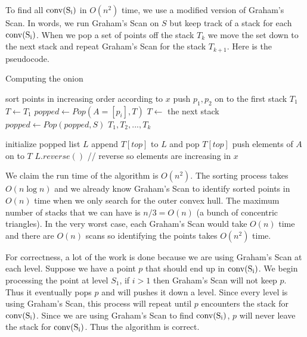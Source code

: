 \documentclass[11pt]{article}
\newcommand{\conv}[1]{\rm{conv}(#1)}
\begin{document}
\answer
To find all $\conv{S_i}$ in $O(n^2)$ time, we use a modified version of Graham's Scan.
In words, we run Graham's Scan on $S$ but keep track of a stack for each $\conv{S_i}$.
When we pop a set of points off the stack $T_k$ we move the set down to the next stack and repeat Graham's Scan for the stack $T_{k+1}$.
Here is the pseudocode.

\begin{algorithm}
\caption{Computing the onion}
    \label{alg:onion}
    \begin{algorithmic}[1]
        \State sort points in increasing order according to $x$
        \State push $p_1, p_2$ on to the first stack $T_1$
            \State $T \gets T_1$
            \State $popped \gets Pop(A=[p_i], T)$
                \State $T \gets$ the next stack
                \State $popped \gets Pop(popped, S)$
            \EndWhile
        \EndFor
        \State \Return $T_1, T_2, ..., T_k$
    \EndFunction
    \end{algorithmic}

    \begin{algorithmic}[1]
        \State initialize popped list $L$
            \State append $T[top]$ to $L$ and pop $T[top]$
        \EndWhile
        \State push elements of $A$ on to $T$
        \State \Return $L.reverse()$ // reverse so elements are increasing in $x$
    \EndFunction
    \end{algorithmic}
\end{algorithm}

We claim the run time of the algorithm is $O(n^2)$.
The sorting process takes $O(n \log n)$ and we already know Graham's Scan to identify sorted points in $O(n)$ time when we only search for the outer convex hull.
The maximum number of stacks that we can have is $n/3 = O(n)$ (a bunch of concentric triangles).
In the very worst case, each Graham's Scan would take $O(n)$ time and there are $O(n)$ scans so identifying the points takes $O(n^2)$ time.

For correctness, a lot of the work is done because we are using Graham's Scan at each level.
Suppose we have a point $p$ that should end up in $\conv{S_i}$.
We begin processing the point at level $S_1$, if $i > 1$ then Graham's Scan will not keep $p$.
Thus it eventually pops $p$ and will pushes it down a level.
Since every level is using Graham's Scan, this process will repeat until $p$ encounters the stack for $\conv{S_i}$.
Since we are using Graham's Scan to find $\conv{S_i}$, $p$ will never leave the stack for $\conv{S_i}$.
Thus the algorithm is correct.
\end{document}
